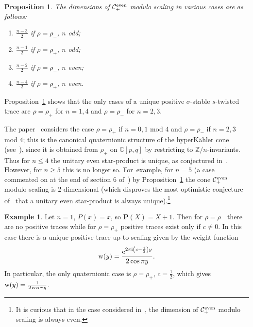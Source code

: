 \documentclass[10pt,a4paper]{amsart}
\newcommand{\mc}[1]{\mathcal{#1}}
\newtheorem{Proposition}[Theorem]{Proposition}
\theoremstyle{definition}
\newtheorem{Example}[Theorem]{Example}
\numberwithin{equation}{section}
\begin{document}
\begin{Proposition}\label{eve}
The dimensions
of $\mc C_+^{\rm even}$ modulo scaling in various cases are as follows:
\begin{enumerate}\itemsep=0pt
\item[$\bullet$] $\frac{n-3}{2}$ if $\rho=\rho_-$, $n$ odd;

\item[$\bullet$] $\frac{n-1}{2}$ if $\rho=\rho_+$, $n$ odd;

\item[$\bullet$] $\frac{n-2}{2}$ if $\rho=\rho_-$, $n$ even;

\item[$\bullet$] $\frac{n-4}{2}$ if $\rho=\rho_+$, $n$ even.
\end{enumerate}
\end{Proposition}

Proposition~\ref{eve} shows that the only cases of a unique positive
$\sigma$-stable $s$-twisted trace are $\rho=\rho_+$ for $n=1,4$ and $\rho=\rho_-$ for $n=2,3$.

The paper~\cite{BPR} considers the case $\rho=\rho_+$ if $n=0,1$ mod $4$
and $\rho=\rho_-$ if $n=2,3$ mod $4$; this is the canonical quaternionic structure of the hyperK\"ahler cone (see~\cite[Section~3.8]{ES}), since it is obtained from $\rho_+$ on $\mathbb C[p,q]$ by restricting to $\mathbb Z/n$-invariants. Thus for $n\le 4$ the unitary even star-product is unique, as conjectured in~\cite{BPR}. However, for $n\ge 5$ this is no longer so. For~example, for $n=5$ (a case commented on at the end of section 6 of~\cite{BPR}) by Proposition~\ref{eve} the cone $\mc C_+^{\rm even}$ modulo scaling is 2-dimensional (which disproves the most optimistic conjecture of~\cite{BPR} that a unitary even star-product is always unique).\footnote{It is curious that in the case considered in~\cite{BPR}, the dimension of $\mc C_+^{\rm even}$ modulo scaling is always even.}


\begin{Example} Let $n=1$, $P(x)=x$, so $\mathbf{P}(X)=X+1$.
Then for $\rho=\rho_-$ there are no positive traces while for $\rho=\rho_+$
positive traces exist only if $c\ne 0$. In this case there is a unique positive trace up to scaling given by the weight function
\[
{\rm w}(y)=\frac{{\rm e}^{2\pi {\rm i}\left(c-\frac{1}{2}\right)y}}{2\cos \pi y}.
\]
In particular, the only quaternionic case is $\rho=\rho_+$, $c=\frac{1}{2}$,
which gives ${\rm w}(y)=\frac{1}{2\cos \pi y}$.

\end{Example}
\end{document}
